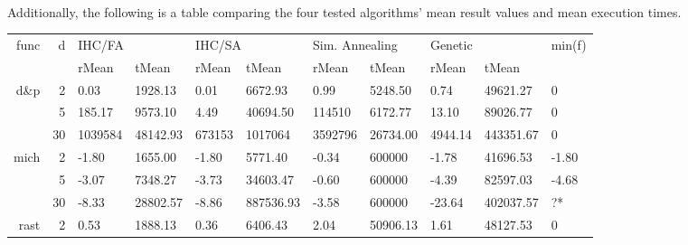 \documentclass{article}
\begin{document}
    \paragraph{}
    Additionally, the following is a table comparing the four tested algorithms' mean result values and mean execution times.

    \begin{table}[!h]
        \setlength\tabcolsep{3pt}
        {\footnotesize
        \begin{tabular}{rr|llllllll|l}
        \multirow{2}{*}{func}       & \multirow{2}{*}{d} & \multicolumn{2}{l}{IHC/FA} & \multicolumn{2}{l}{IHC/SA} & \multicolumn{2}{l}{Sim. Annealing} & \multicolumn{2}{l}{Genetic} & \multirow{2}{*}{min(f)} \\
                                        &                    & rMean        & tMean       & rMean       & tMean        & rMean           & tMean            & rMean       & tMean         &                         \\
        \hline
        \multirow{3}{*}{d\&p} & 2                  & 0.03         & 1928.13     & 0.01        & 6672.93      & 0.99            & 5248.50          & 0.74        & 49621.27      & 0                       \\
                                        & 5                  & 185.17       & 9573.10     & 4.49        & 40694.50     & 114510       & 6172.77          & 13.10       & 89026.77      & 0                       \\
                                        & 30                 & 1039584   & 48142.93    & 673153  & 1017064  & 3592796      & 26734.00         & 4944.14     & 443351.67     & 0                       \\
        \multirow{3}{*}{mich}    & 2                  & -1.80        & 1655.00     & -1.80       & 5771.40      & -0.34           & 600000    & -1.78       & 41696.53      & -1.80                 \\
                                        & 5                  & -3.07        & 7348.27     & -3.73       & 34603.47     & -0.60           & 600000     & -4.39       & 82597.03      & -4.68               \\
                                        & 30                 & -8.33        & 28802.57    & -8.86       & 887536.93    & -3.58           & 600000     & -23.64      & 402037.57     & ?*                \\
        \multirow{3}{*}{rast}      & 2                  & 0.53         & 1888.13     & 0.36        & 6406.43      & 2.04            & 50906.13         & 1.61        & 48127.53      & 0                       \\

\end{tabular}}
\end{table}
\end{document}
